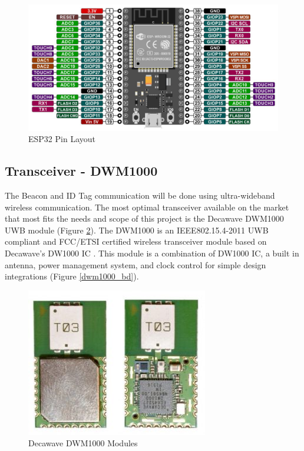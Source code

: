 \medskip
\begin{figure}[H]
\centering
    \includegraphics[scale=0.5]{./images/esp32_pin.png}
    \caption{ESP32 Pin Layout}
    \label{esp_pin}
\end{figure}


\pagebreak
\subsection{Transceiver - DWM1000} 
\medskip
The Beacon and ID Tag communication will be done using ultra-wideband wireless communication. The most optimal transceiver available on the market that most fits the needs and scope of this project is the Decawave DWM1000 UWB module (Figure \ref{dwm1000}). The DWM1000 is an IEEE802.15.4-2011 UWB compliant and \Gls{FCC}/\Gls{ETSI} certified wireless transceiver module based on Decawave’s DW1000 IC \cite{R4-2-1}. This module is a combination of DW1000 IC, a built in antenna, power management system, and clock control for simple design integrations (Figure \ref{dwm1000_bd}). 

\medskip
\begin{figure}[H]
\centering
    \includegraphics[scale=0.75]{./images/dwm1000.jpg}
    \caption{Decawave DWM1000 Modules}
    \label{dwm1000}
\end{figure}

